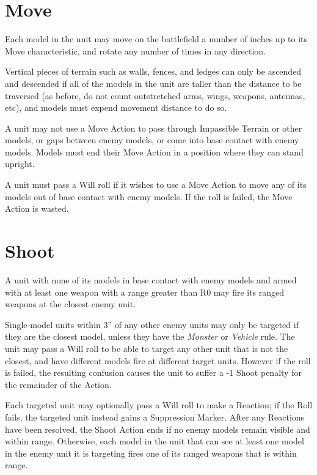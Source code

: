 \begin{multicols}{2}
\section*{Move}
Each model in the unit may move on the battlefield a number of inches up to its Move characteristic, and rotate any number of times in any direction.

Vertical pieces of terrain such as walls, fences, and ledges can only be ascended and descended if all of the models in the unit are taller than the distance to be traversed (as before, do not count outstretched arms, wings, weapons, antennas, etc), and models must expend movement distance to do so.

A unit may not use a Move Action to pass through Impassible Terrain or other models, or gaps between enemy models, or come into base contact with enemy models. Models must end their Move Action in a position where they can stand upright. 

A unit must pass a Will roll if it wishes to use a Move Action to move any of its models out of base contact with enemy models. If the roll is failed, the Move Action is wasted.




\section*{Shoot}
A unit with none of its models in base contact with enemy models and armed with at least one weapon with a range greater than R0 may fire its ranged weapons at the closest enemy unit.

Single-model units within 3'' of any other enemy units may only be targeted if they are the closest model, unless they have the \textit{Monster} or \textit{Vehicle} rule. The unit may pass a Will roll to be able to target any other unit that is not the closest, and have different models fire at different target units. However if the roll is failed, the resulting confusion causes the unit to suffer a -1 Shoot penalty for the remainder of the Action.

Each targeted unit may optionally pass a Will roll to make a Reaction; if the Roll fails, the targeted unit instead gains a Suppression Marker. After any Reactions have been resolved, the Shoot Action ends if no enemy models remain visible and within range. Otherwise, each model in the unit that can see at least one model in the enemy unit it is targeting fires one of its ranged weapons that is within range.


\end{multicols}
